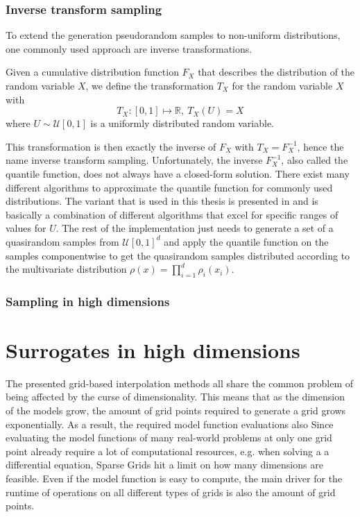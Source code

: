 \documentclass[
  a4paper,  %
  twoside,  %
  bibliography=totoc,
  headsepline,
  cleardoublepage=empty,
  parskip=half,
  draft=false
]{scrbook}
\begin{document}
\subsection{Inverse transform sampling}
To extend the generation pseudorandom samples to non-uniform distributions, one commonly used approach are inverse transformations.
\begin{definition}
Given a cumulative distribution function $F_X$ that describes the distribution of the random variable $X$, we define the transformation $T_X$ for the random variable $X$ with
\begin{equation}
T_X \colon [0,1] \mapsto \mathds{R}, ~ T_X(U)=X
\end{equation}
where $U \sim \mathcal{U}[0,1]$ is a uniformly distributed random variable.
\end{definition}
This transformation is then exactly the inverse of $F_X$ with $T_X=F_X^{-1}$, hence the name inverse transform sampling.
Unfortunately, the inverse $F_X^{-1}$, also called the quantile function, does not always have a closed-form solution.
There exist many different algorithms to approximate the quantile function for commonly used distributions.
The variant that is used in this thesis is presented in \cite{} and is basically a combination of different algorithms that excel for specific ranges of values for $U$.
The rest of the implementation just needs to generate a set of a quasirandom samples from $\mathcal{U}[0,1]^d$ and apply the quantile function on the samples componentwise to get the quasirandom samples distributed according to the multivariate distribution $\rho(x)=\prod_{i=1}^d \rho_i(x_i)$.


\subsection{Sampling in high dimensions}







\chapter{Surrogates in high dimensions}

The presented grid-based interpolation methods all share the common problem of being affected by the curse of dimensionality.
This means that as the dimension of the models grow, the amount of grid points required to generate a grid grows exponentially.
As a result, the required model function evaluations also
Since evaluating the model functions of many real-world problems at only one grid point already require a lot of computational resources, e.g. when solving a a differential equation, Sparse Grids hit a limit on how many dimensions are feasible.
Even if the model function is easy to compute, the main driver for the runtime of operations on all different types of grids is also the amount of grid points.
\end{document}
